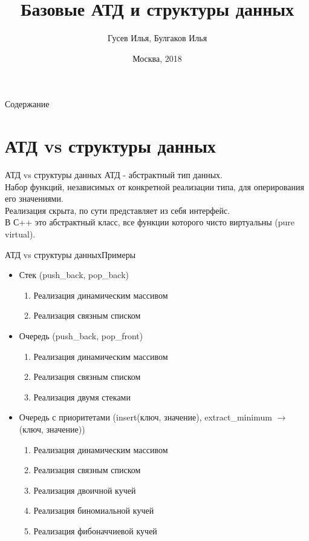 \documentclass[10pt]{beamer}
\title[\href{https://goo.gl/NRgp8K}{https://goo.gl/NRgp8K} (Term 1)]{Базовые АТД и структуры данных}
\author[Гусев Илья, Булгаков Илья]{Гусев Илья, Булгаков Илья}
\institute[МФТИ] 
{Московский физико-технический институт\\*}
\date{Москва, 2018}
\begin{document}
\begin{frame}
  \titlepage
\end{frame}

\begin{frame}{Содержание}
\tableofcontents
\end{frame}

\section{АТД vs структуры данных}
\begin{frame}[fragile]{АТД vs структуры данных}
АТД - абстрактный тип данных.\\
Набор функций, независимых от конкретной реализации типа, для оперирования его значениями.\\
Реализация скрыта, по сути представляет из себя интерфейс. \\
В С++ это абстрактный класс, все функции которого чисто виртуальны (pure virtual). \\
\end{frame}

\begin{frame}[fragile]{АТД vs структуры данных}{Примеры}
\begin{itemize}
    \item Стек (push\_back, pop\_back)
        \begin{enumerate}
            \item Реализация динамическим массивом
            \item Реализация связным списком
        \end{enumerate}
    \item Очередь (push\_back, pop\_front)
        \begin{enumerate}
            \item Реализация динамическим массивом
            \item Реализация связным списком
            \item Реализация двумя стеками
        \end{enumerate}
    \item Очередь с приоритетами (insert(ключ, значение), extract\_minimum $\rightarrow$ (ключ, значение))
        \begin{enumerate}
            \item Реализация динамическим массивом
            \item Реализация связным списком
            \item Реализация двоичной кучей
            \item Реализация биномиальной кучей
            \item Реализация фибоначчиевой кучей
        \end{enumerate}
\end{itemize}
\end{frame}
\end{document}
